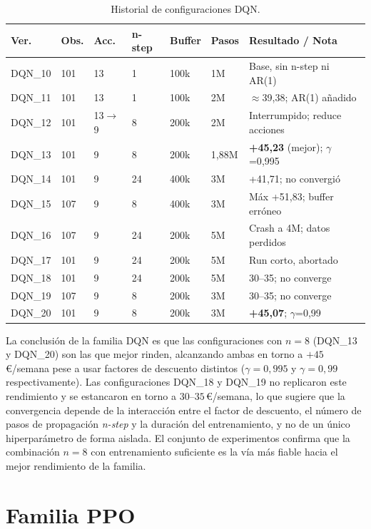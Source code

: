 \documentclass[12pt, a4paper, twoside]{report}
\begin{document}
\begin{table}[H]
\centering
\caption{Historial de configuraciones DQN.}
\label{tab:hist_dqn}
\small
\begin{tabularx}{\textwidth}{lL{1.4cm}L{1cm}L{1.3cm}L{1.2cm}L{1.3cm}X}
\toprule
\textbf{Ver.} & \textbf{Obs.} & \textbf{Acc.} & \textbf{n-step} &
\textbf{Buffer} & \textbf{Pasos} & \textbf{Resultado / Nota} \\
\midrule
DQN\_10 & 101 & 13 & 1 & 100k & 1M & Base, sin n-step ni AR(1) \\
DQN\_11 & 101 & 13 & 1 & 100k & 2M & $\approx$39{,}38; AR(1) añadido \\
DQN\_12 & 101 & 13$\to$9 & 8 & 200k & 2M & Interrumpido; reduce acciones \\
DQN\_13 & 101 & 9 & 8 & 200k & 1{,}88M & \textbf{+45{,}23} (mejor); $\gamma$=0{,}995 \\
DQN\_14 & 101 & 9 & 24 & 400k & 3M & +41{,}71; no convergió \\
DQN\_15 & 107 & 9 & 8 & 400k & 3M & Máx +51{,}83; buffer erróneo \\
DQN\_16 & 107 & 9 & 24 & 200k & 5M & Crash a 4M; datos perdidos \\
DQN\_17 & 101 & 9 & 24 & 200k & 5M & Run corto, abortado \\
DQN\_18 & 101 & 9 & 24 & 200k & 5M & 30--35; no converge \\
DQN\_19 & 107 & 9 & 8 & 200k & 3M & 30--35; no converge \\
DQN\_20 & 101 & 9 & 8 & 200k & 3M & \textbf{+45{,}07}; $\gamma$=0{,}99 \\
\bottomrule
\end{tabularx}
\end{table}

La conclusión de la familia DQN es que las configuraciones con $n=8$ (DQN\_13 y
DQN\_20) son las que mejor rinden, alcanzando ambas en torno a
$+45$\,€/semana pese a usar factores de descuento distintos ($\gamma=0{,}995$ y
$\gamma=0{,}99$ respectivamente). Las configuraciones DQN\_18 y DQN\_19 no
replicaron este rendimiento y se estancaron en torno a $30$--$35$\,€/semana, lo
que sugiere que la convergencia depende de la interacción entre el factor de
descuento, el número de pasos de propagación \textit{n-step} y la duración del
entrenamiento, y no de un único hiperparámetro de forma aislada. El conjunto de
experimentos confirma que la combinación $n=8$ con entrenamiento suficiente es
la vía más fiable hacia el mejor rendimiento de la familia.

\section{Familia PPO}
\end{document}
